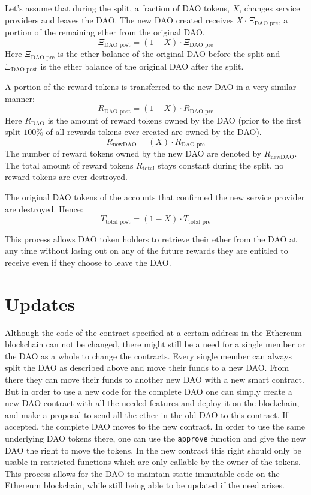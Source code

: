 \documentclass[9pt,oneside]{amsart}
\begin{document}
\begin{multicols}{2}
Let’s assume that during the split, a fraction of DAO tokens, $X$, changes service providers and leaves the DAO. The new DAO created receives $X \cdot \Xi_{\text{DAO pre}}$, a portion of the remaining ether from the original DAO.
\begin{equation}
 \Xi_{\text{DAO post}} = (1 - X) \cdot \Xi_{\text{DAO pre}}
\end{equation}
Here $\Xi_{\text{DAO pre}}$ is the ether balance of the original DAO before the split and $\Xi_{\text{DAO post}}$ is the ether balance of the original DAO after the split.

A portion of the reward tokens is transferred to the new DAO in a very similar manner:
\begin{equation}
 R_{\text{DAO post}} = (1 - X) \cdot R_{\text{DAO pre}}
\end{equation}
Here $R_{\text{DAO}}$ is the amount of reward tokens owned by the DAO (prior to the first split $100\%$ of all rewards tokens ever created are owned by the DAO).
\begin{equation}
 R_{\text{newDAO}} = (X) \cdot R_{\text{DAO pre}}
\end{equation}
The number of reward tokens owned by the new DAO are denoted by $R_{\text{newDAO}}$.
The total amount of reward tokens $R_{\text{total}}$ stays constant during the split, no reward tokens are ever destroyed.

The original DAO tokens of the accounts that confirmed the new service provider are destroyed.
Hence:
\begin{equation}
 T_{\text{total post}}= (1 - X) \cdot T_{\text{total pre}}
\end{equation}

This process allows DAO token holders to retrieve their ether from the DAO at any time without losing out on any of the future rewards they are entitled to receive even if they choose to leave the DAO.

\section{Updates}
Although the code of the contract specified at a certain address in the Ethereum blockchain can not be changed, there might still be a need for a single member or the DAO as a whole to change the contracts.
Every single member can always split the DAO as described above and move their funds to a new DAO. From there they can move their funds to another new DAO with a new smart contract.
But in order to use a new code for the complete DAO one can simply create a new DAO contract with all the needed features and deploy it on the blockchain, and make a proposal to send all the ether in the old DAO to this contract.
If accepted, the complete DAO moves to the new contract. In order to use the same underlying DAO tokens there, one can use the \verb|approve| function and give the new DAO the right to move the tokens. In the new contract this right should only be usable in restricted functions which are only callable by the owner of the tokens. This process allows for the DAO to maintain static immutable code on the Ethereum blockchain, while still being able to be updated if the need arises.


\end{multicols}
\end{document}
